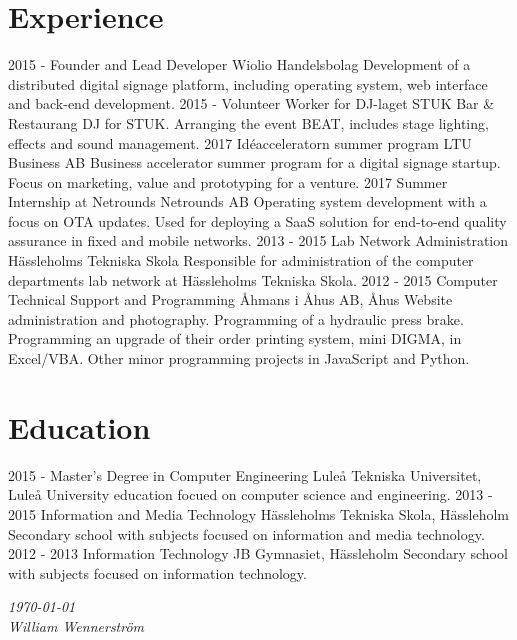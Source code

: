 \documentclass[]{friggeri-cv}
\begin{document}
\section{Experience}
\begin{entrylist}
    \entry
    {2015 -}
    {Founder and Lead Developer}
    {Wiolio Handelsbolag}
    {Development of a distributed digital signage platform, including operating system, web interface and back-end development.}
    \entry
    {2015 -}
    {Volunteer Worker for DJ-laget}
    {STUK Bar \& Restaurang}
    {DJ for STUK. Arranging the event BEAT, includes stage lighting, effects and sound management.}
    \entry
    {2017}
    {Idéacceleratorn summer program}
    {LTU Business AB}
    {Business accelerator summer program for a digital signage startup. Focus on marketing, value and prototyping for a venture.}
    \entry
    {2017}
    {Summer Internship at Netrounds}
    {Netrounds AB}
    {Operating system development with a focus on OTA updates. Used for deploying a SaaS solution for end-to-end quality assurance in fixed and mobile networks.}
    \entry
    {2013 - 2015}
    {Lab Network Administration}
    {Hässleholms Tekniska Skola}
    {Responsible for administration of the computer departments lab network at Hässleholms Tekniska Skola.}
    \entry
    {2012 - 2015}
    {Computer Technical Support and Programming}
    {Åhmans i Åhus AB, Åhus}
    {Website administration and photography. Programming of a hydraulic press brake. Programming an upgrade of their order printing system, mini DIGMA, in Excel/VBA. Other minor programming projects in JavaScript and Python.\\}
\end{entrylist}

\section{Education}
\begin{entrylist}
  \entry
    {2015 -}
    {Master's Degree in Computer Engineering}
    {Luleå Tekniska Universitet, Luleå}
    {University education focued on computer science and engineering.}
  \entry
    {2013 - 2015}
    {Information and Media Technology}
    {Hässleholms Tekniska Skola, Hässleholm}
    {Secondary school with subjects focused on information and media technology.}
  \entry
    {2012 - 2013}
    {Information Technology}
    {JB Gymnasiet, Hässleholm}
    {Secondary school with subjects focused on information technology.}
\end{entrylist}

\begin{flushright}
\emph{\today} \\
\emph{William Wennerström}
\end{flushright}
\end{document}
